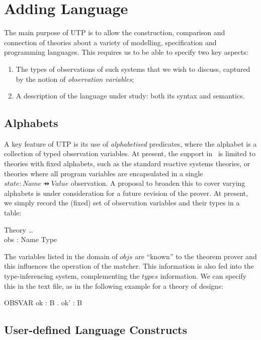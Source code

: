 \section{Adding Language}
\label{sec:language:foundation}

%
%

The main purpose of UTP is to allow the construction,
comparison and connection of theories about a variety of
modelling, specification and programming languages.
This requires us to be able to specify two key aspects:
\begin{enumerate}
  \item The types of observations of such systems that we wish to discuss,
   captured by the notion of \emph{observation variables};
  \item A description of the language under study: both its syntax and semantics.
\end{enumerate}

\subsection{Alphabets}

A key feature of UTP is its use of \emph{alphabetised} predicates,
where the alphabet is a collection of typed observation variables.
At present, the support in \STHN\
is limited to theories with fixed alphabets, such as the standard
reactive systems theories, or theories where all program variables
are encapsulated in a single $state : Name \pfun Value$ observation.
A proposal to broaden this to cover varying alphabets is under consideration
for a future revision of the prover.
At present, we simply record the (fixed) set of observation
variables and their types in a table:
\begin{schema}{Theory}
   \ldots
\\ obs : Name \pfun Type
\end{schema}
The variables listed in the domain of $objs$ are ``known'' to the theorem prover
and this influences the operation of the matcher.
This information is also fed into the type-inferencing system,
complementing the $types$ information.
We can specify this in the text file, as in the following example
for a theory of designs:
\begin{haskell}
OBSVAR
 ok : B .
 ok' : B
\end{haskell}


\subsection{User-defined Language Constructs}

